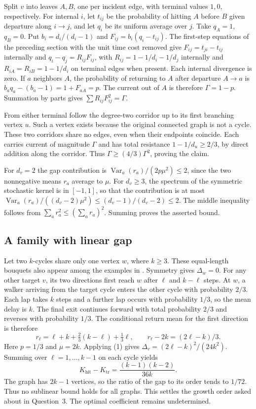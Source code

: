 \documentclass[11pt]{article}
\newcommand{\Kh}{K_{\mathrm{hit}}}
\newcommand{\Kt}{K_{\mathrm{tr}}}
\begin{document}
Split $v$ into leaves $A,B$, one per incident edge, with terminal
values $1,0$, respectively. For internal $i$, let $t_{ij}$ be the
probability of hitting $A$ before $B$ given departure along $i\to j$,
and let $q_i$ be its uniform average over $j$. Take $q_A=1$, $q_B=0$. Put
$b_i=d_i/(d_i-1)$ and $F_{ij}=b_i(q_i-t_{ij})$.
The first-step equations of the preceding section with the unit
time cost removed give $F_{ij}=t_{ji}-t_{ij}$ internally and
$q_i-q_j=R_{ij}F_{ij}$, with
$R_{ij}=1-1/d_i-1/d_j$ internally and $R_{iA}=R_{iB}=1-1/d_i$
on terminal edges when present.
Each internal divergence is zero. If $a$ neighbors $A$, the probability
of returning to $A$ after departure $A\to a$ is
$b_aq_a-(b_a-1)=1+F_{aA}=p$.
The current out of $A$ is therefore $\Gamma=1-p$. Summation by
parts gives $\sum R_{ij}F_{ij}^2=\Gamma$.

From either terminal follow the degree-two corridor up to its first
branching vertex $u$. Such a vertex exists because the original
connected graph is not a cycle. These two corridors share no edges,
even when their endpoints coincide. Each carries current of magnitude
$\Gamma$ and has total resistance $1-1/d_u\ge2/3$, by direct addition
along the corridor. Thus $\Gamma\ge(4/3)\Gamma^2$, proving the claim.

For $d_v=2$ the gap contribution is
$\operatorname{Var}_a(r_a)/(2p\mu^2)\le 2$, since the two nonnegative
means $r_a$ average to $\mu$. For $d_v\ge3$, the spectrum of the
symmetric stochastic kernel is in $[-1,1]$, so that the contribution
is at most $\operatorname{Var}_a(r_a)/((d_v-2)\mu^2)\le
(d_v-1)/(d_v-2)\le2$. The middle inequality follows from
$\sum_a r_a^2\le(\sum_a r_a)^2$. Summing proves the asserted bound.

\subsection{A family with linear gap}
Let two $k$-cycles share only one vertex $w$, where $k\ge3$. These equal-length bouquets also appear among the examples in \cite[Section~4.4]{breen}. Symmetry gives $\Delta_w=0$. For any other target $v$, its two directions first reach $w$ after $\ell$ and $k-\ell$ steps. At $w$, a walker arriving from the target cycle enters the other cycle with probability $2/3$. Each lap takes $k$ steps and a further lap occurs with probability $1/3$, so the mean delay is $k$. The final exit continues forward with total probability $2/3$ and reverses with probability $1/3$. The conditional return mean for the first direction is therefore
\[
 r_\ell=\ell+k+\tfrac23(k-\ell)+\tfrac13\ell,\qquad
 r_\ell-2k=(2\ell-k)/3 .
\]
Here $p=1/3$ and $\mu=2k$. Applying (1) gives $\Delta_v=(2\ell-k)^2/(24k^2)$. Summing over $\ell=1,\dots,k-1$ on each cycle yields
\[
                  \Kh-\Kt=\frac{(k-1)(k-2)}{36k}.
\]
The graph has $2k-1$ vertices, so the ratio of the gap to its order tends to $1/72$. Thus no sublinear bound holds for all graphs. This settles the growth order asked about in Question~3. The optimal coefficient remains undetermined.
\end{document}
